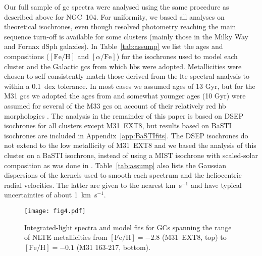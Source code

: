 \documentclass{aa}
\begin{document}
\begin{table*}
{}
\end{table*}


Our full sample of \ac{gc} spectra were analysed using the same procedure as described above for NGC~104.
For uniformity, we based all analyses on theoretical isochrones, even though resolved photometry reaching the main sequence turn-off is available for some clusters (mainly those in the Milky Way and Fornax dSph galaxies).
In Table~\ref{tab:assump} we list the ages and compositions ($\mathrm{[Fe/H]}$ and $[\alpha/\mathrm{Fe}]$) for the isochrones used to model each cluster and the Galactic \acp{gc} from which
\acp{hb} were adopted. Metallicities were chosen to self-consistently match those derived from the \ac{lte} spectral analysis to within a 0.1~dex tolerance. In most cases we assumed ages of 13 Gyr, but for the M31 \acp{gc} we adopted the ages from \citet{Caldwell2011} and somewhat younger ages (10 Gyr) were assumed for several of the M33 \acp{gc} on account of their relatively red \ac{hb} morphologies \citep{Sarajedini2000}.
The analysis in the remainder of this paper is based on DSEP isochrones for all clusters except M31~EXT8, but results based on BaSTI isochrones are included in Appendix~\ref{app:BaSTIfits}.  The DSEP isochrones do not extend to the low metallicity of M31~EXT8 and we based the analysis of this cluster on a BaSTI isochrone, instead of using a MIST isochrone with scaled-solar composition as was done in \citet{Larsen2020}.
Table~\ref{tab:assump} also lists the Gaussian dispersions of the kernels used to smooth each spectrum and the heliocentric radial velocities. The latter are given to the nearest km~s$^{-1}$ and have typical uncertainties of about 1~km~s$^{-1}$.  

\begin{figure}
\centering
\texttt{[image: fig4.pdf]}
\caption{\label{fig:spcmp}Integrated-light spectra and model fits for GCs spanning the range of NLTE  metallicities from $\mathrm{[Fe/H]}=-2.8$ (M31~EXT8, top) to $\mathrm{[Fe/H]}=-0.1$ (M31 163-217, bottom).}
\end{figure}
\end{document}
